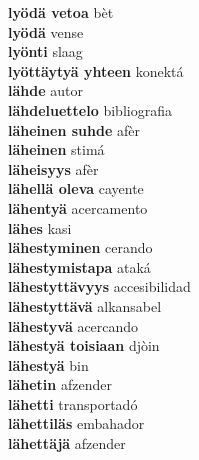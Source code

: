 \textbf{ lyödä vetoa  } bèt \\
\textbf{ lyödä  } vense \\
\textbf{ lyönti  } slaag \\
\textbf{ lyöttäytyä yhteen  } konektá \\
\textbf{ lähde  } autor \\
\textbf{ lähdeluettelo  } bibliografia \\
\textbf{ läheinen suhde  } afèr \\
\textbf{ läheinen  } stimá \\
\textbf{ läheisyys  } afèr \\
\textbf{ lähellä oleva  } cayente \\
\textbf{ lähentyä  } acercamento \\
\textbf{ lähes  } kasi \\
\textbf{ lähestyminen  } cerando \\
\textbf{ lähestymistapa  } ataká \\
\textbf{ lähestyttävyys  } accesibilidad \\
\textbf{ lähestyttävä  } alkansabel \\
\textbf{ lähestyvä  } acercando \\
\textbf{ lähestyä toisiaan  } djòin \\
\textbf{ lähestyä  } bin \\
\textbf{ lähetin  } afzender \\
\textbf{ lähetti  } transportadó \\
\textbf{ lähettiläs  } embahador \\
\textbf{ lähettäjä  } afzender \\
